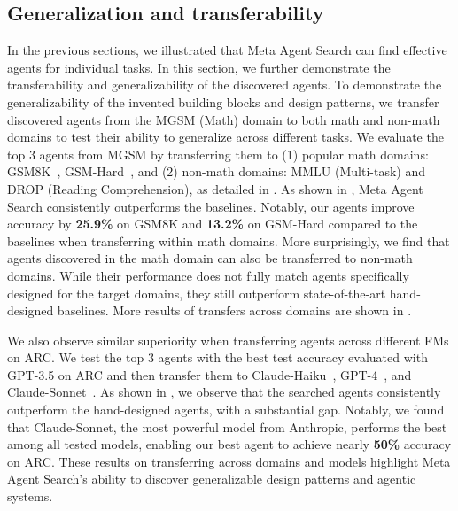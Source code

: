 \documentclass{article} %
\newcommand{\ouralgo}{Meta Agent Search\xspace}
\begin{document}
\subsection{Generalization and transferability}

\label{section:expr_generalization}
In the previous sections, we illustrated that \ouralgo can find effective agents for individual tasks.
In this section, we further demonstrate the transferability and generalizability of the discovered agents.
To demonstrate the generalizability of the invented building blocks and design patterns, we transfer discovered agents from the MGSM (Math) domain to both math and non-math domains to test their ability to generalize across different tasks. We evaluate the top 3 agents from MGSM by transferring them to (1) popular math domains: GSM8K~\citep{cobbe2021gsm8k}, GSM-Hard~\citep{gao2023gsmhard}, and (2) non-math domains: MMLU (Multi-task) and DROP (Reading Comprehension), as detailed in . As shown in , \ouralgo consistently outperforms the baselines. Notably, our agents improve accuracy by \textbf{25.9\%} on GSM8K and \textbf{13.2\%} on GSM-Hard compared to the baselines when transferring within math domains. More surprisingly, we find that agents discovered in the math domain can also be transferred to non-math domains. While their performance does not fully match agents specifically designed for the target domains, they still outperform state-of-the-art hand-designed baselines. More results of transfers across domains are shown in .

We also observe similar superiority when transferring agents across different FMs on ARC. We test the top 3 agents with the best test accuracy evaluated with GPT-3.5 on ARC and then transfer them to Claude-Haiku~\citep{anthropic_2024_claude3}, GPT-4~\citep{openai2024gpt4}, and Claude-Sonnet~\citep{anthropic_claude3.5}. As shown in , we observe that the searched agents consistently outperform the hand-designed agents, with a substantial gap. Notably, we found that Claude-Sonnet, the most powerful model from Anthropic, performs the best among all tested models, enabling our best agent to achieve nearly \textbf{50\%} accuracy on ARC. These results on transferring across domains and models highlight \ouralgo’s ability to discover generalizable design patterns and agentic systems.  
\end{document}
